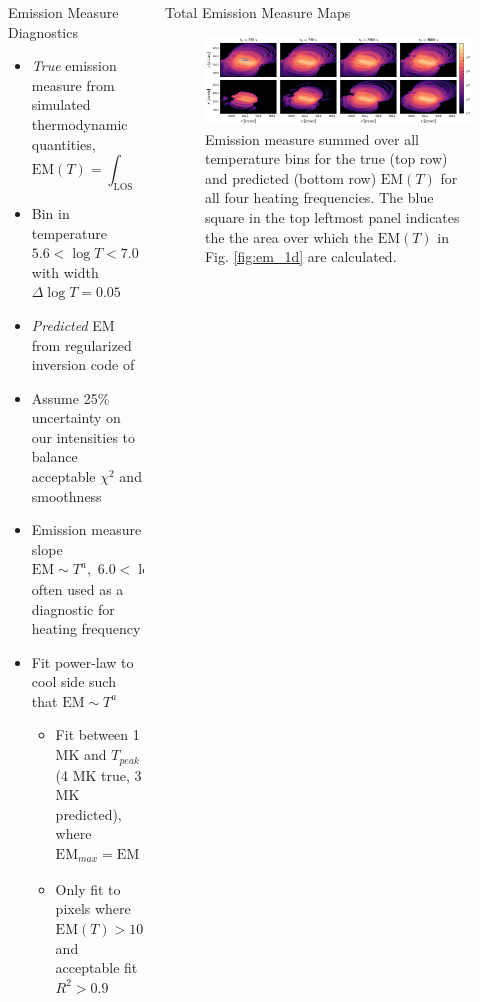 \documentclass[final]{beamer}
\begin{document}
\begin{frame}
\begin{columns}[T]
\begin{column}{0.49\linewidth}
\begin{block}{Emission Measure Diagnostics}
\begin{itemize}
        \item \textit{True} emission measure from simulated thermodynamic quantities,
              \begin{equation*}
                \mathrm{EM}(T) = \int_{\mathrm{LOS}}\mathrm{d}h\,n^2(h,T)
              \end{equation*} 
        \item Bin in temperature $5.6<\log{T}<7.0$ with width $\Delta\log{T}=0.05$
        \item \textit{Predicted} EM from regularized inversion code of \citet{hannah_differential_2012}
        \item Assume 25\% uncertainty on our intensities to balance acceptable $\chi^2$ and smoothness
        \item Emission measure slope $\mathrm{EM}\sim T^a,\,\,6.0<\log{T}<\log{T_{peak}}$ often used as a diagnostic for heating frequency
        \item Fit power-law to cool side such that $\mathrm{EM}\sim T^a$
        \begin{itemize}
          \item Fit between 1 MK and $T_{peak}$ (4 MK true, 3 MK predicted), where $\mathrm{EM}_{max}=\mathrm{EM}(T_{peak})$
          \item Only fit to pixels where $\mathrm{EM}(T)>10^{25}\,\,\mathrm{cm}^{-5}$ and acceptable fit $R^2>0.9$
        \end{itemize}
      \end{itemize}
    \end{block}
  \end{column}
  \begin{column}{0.49\linewidth}
    \begin{block}{Total Emission Measure Maps}
      \begin{figure}
        \includegraphics[width=\columnwidth]{figures/total_em_maps.pdf}
        \caption{Emission measure summed over all temperature bins for the true (top row) and predicted (bottom row) $\mathrm{EM}(T)$ for all four heating frequencies. The blue square in the top leftmost panel indicates the the area over which the $\mathrm{EM}(T)$ in Fig. \ref{fig:em_1d} are calculated.} 

\end{figure}
\end{block}
\end{column}
\end{columns}
\end{frame}
\end{document}
